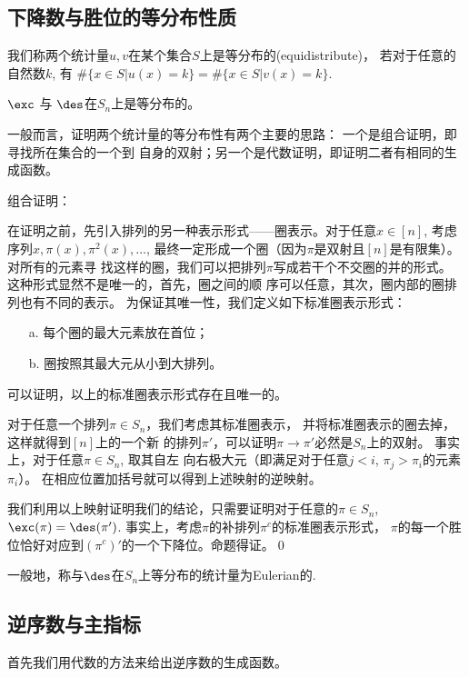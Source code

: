 \subsection{下降数与胜位的等分布性质}
我们称两个统计量$u,v$在某个集合$S$上是{等分布的}(equidistribute)，
若对于任意的自然数$k$, 有
$\#\{x\in S|u(x)=k\}=\#\{x\in S|v(x)=k\}$.

\begin{thm} \label{exc_des}
$\exc$ 与 $\des$在$S_n$上是等分布的。
\end{thm}

一般而言，证明两个统计量的等分布性有两个主要的思路：
一个是组合证明，即寻找所在集合的一个到
自身的双射；另一个是代数证明，即证明二者有相同的生成函数。

\pf 组合证明：

在证明之前，先引入排列的另一种表示形式——圈表示。对于任意$x\in
[n]$, 考虑 序列$x,\pi(x),\pi^2(x),\ldots$,
最终一定形成一个圈（因为$\pi$是双射且$[n]$是有限集）。对所有的元素寻
找这样的圈，我们可以把排列$\pi$写成若干个不交圈的并的形式。
这种形式显然不是唯一的，首先，圈之间的顺
序可以任意，其次，圈内部的圈排列也有不同的表示。
为保证其唯一性，我们定义如下标准圈表示形式：

\begin{itemize}
   \item [a.]每个圈的最大元素放在首位；
   \item [b.]圈按照其最大元从小到大排列。
\end{itemize}


可以证明，以上的标准圈表示形式存在且唯一的。

对于任意一个排列$\pi\in S_n$，我们考虑其标准圈表示，
并将标准圈表示的圈去掉，这样就得到$[n]$上的一个新
的排列$\pi'$，可以证明$\pi\rightarrow \pi'$必然是$S_n$上的双射。
事实上，对于任意$\pi\in S_n$, 取其自左
向右极大元（即满足对于任意$j<i$, $\pi_j>\pi_i$的元素$\pi_i$）。
在相应位置加括号就可以得到上述映射的逆映射。

我们利用以上映射证明我们的结论，只需要证明对于任意的$\pi\in S_n$,
$\exc(\pi)=\des(\pi')$.
事实上，考虑$\pi$的补排列$\pi^c$的标准圈表示形式，
$\pi$的每一个胜位恰好对应到$(\pi^c)'$的一个下降位。命题得证。\qed

一般地，称与$\des$在$S_n$上等分布的统计量为Eulerian的.


\subsection{逆序数与主指标}

首先我们用代数的方法来给出逆序数的生成函数。

